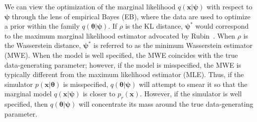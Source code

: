 \documentclass[twocolumn,superscriptaddress,aps]{revtex4-1}
\newcommand{\kcnote}[1]{\textcolor{red}{[KC: #1]}}
\newcommand{\qxpsi}{q(\mathbf{x}|\bfpsi)}
\newcommand{\bftheta}{{\bm \theta}}
\newcommand{\bfpsi}{{\bm \psi}}
\newcommand{\bfx}{\mathbf{x}}
\theoremstyle{plain}
\begin{document}




We can view the optimization of the marginal likelihood $q(\bfx | \bfpsi)$ with respect to $\bfpsi$ through the lens of empirical Bayes (EB), where the data are used to optimize a prior within the family $q(\bftheta|\bfpsi)$. If $\rho$ is the KL distance, $\bfpsi^*$ would correspond to the maximum marginal likelihood estimator advocated by Rubin~\citep{rubin1984}.
When $\rho$ is the Wasserstein distance, $\bfpsi^*$ is referred to as the
minimum Wasserstein estimator (MWE).
When the model is well specified, the MWE
coincides with the true data-generating parameter; however, if the model is
misspecified, the MWE is typically different from the maximum likelihood
estimator (MLE).
Thus, if the simulator $p(\bfx |
\bftheta)$ is misspecified, $q(\bftheta | \bfpsi)$ will attempt to smear it so that the marginal
model $q(\bfx | \bfpsi)$ is closer to $p_r(\bfx)$. However, if the simulator is well specified,
then $q(\bftheta | \bfpsi)$ will concentrate its mass around the true data-generating parameter.

\end{document}
